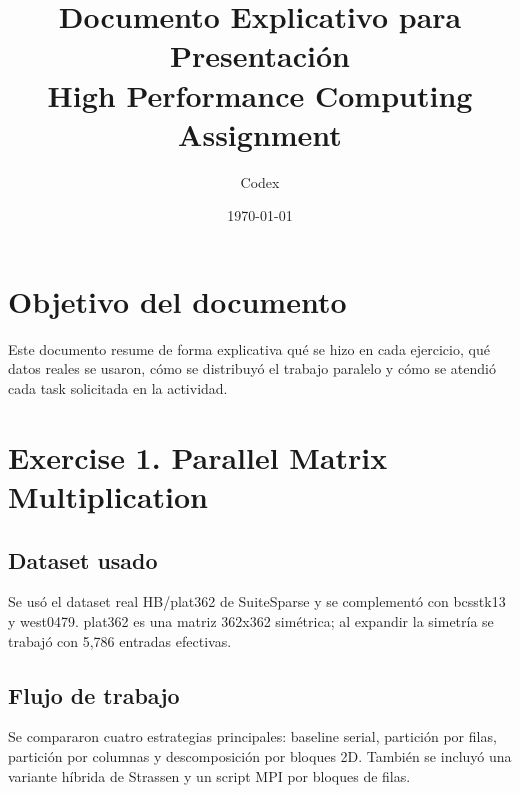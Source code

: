 \documentclass[11pt]{article}
\title{Documento Explicativo para Presentación\\High Performance Computing Assignment}
\author{Codex}
\date{\today}
\begin{document}
\maketitle
\section*{Objetivo del documento}
Este documento resume de forma explicativa qué se hizo en cada ejercicio, qué datos reales se usaron, cómo se distribuyó el trabajo paralelo y cómo se atendió cada task solicitada en la actividad.
\section*{Exercise 1. Parallel Matrix Multiplication}
\subsection*{Dataset usado}
Se usó el dataset real HB/plat362 de SuiteSparse y se complementó con bcsstk13 y west0479. plat362 es una matriz 362x362 simétrica; al expandir la simetría se trabajó con 5,786 entradas efectivas.
\subsection*{Flujo de trabajo}
Se compararon cuatro estrategias principales: baseline serial, partición por filas, partición por columnas y descomposición por bloques 2D. También se incluyó una variante híbrida de Strassen y un script MPI por bloques de filas.
\end{document}
